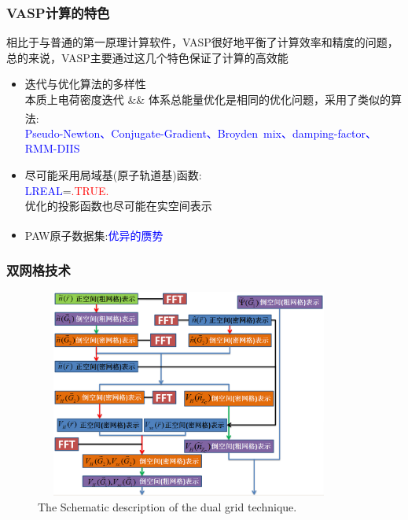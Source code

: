 \documentclass[cjk,slidestop,compress,mathserif,blue]{beamer}
\newcommand{\upcite}[1]{\hspace{0ex}\textsuperscript{\cite{#1}}} %
\begin{document}
\frame
{
	\frametitle{\textrm{VASP}计算的特色}
	相比于与普通的第一原理计算软件，\textrm{VASP}很好地平衡了计算效率和精度的问题，总的来说，\textrm{VASP}主要通过这几个特色保证了计算的高效能
	\begin{itemize}
	     \item 迭代与优化算法的多样性\\
		     本质上电荷密度迭代 \textrm{\&\&} 体系总能量优化是相同的优化问题，采用了类似的算法\upcite{CMS6-15_1996,PRB54-11169_1996}:\\
			\textcolor{blue}{\textrm{Pseudo-Newton、Conjugate-Gradient、Broyden~mix、damping-factor、RMM-DIIS}}
	     \item 尽可能采用局域基(原子轨道基)函数:~\\
		     \textcolor{blue}{\textrm{LREAL}}=\textcolor{red}{\textrm{.TRUE.}}\\
			优化的投影函数也尽可能在实空间表示
	     \item \textrm{PAW}原子数据集:\textcolor{blue}{优异的赝势}\upcite{PRB59-1758_1999}
	\end{itemize}
}

\frame
{
	\frametitle{双网格技术}
\begin{figure}[h!]
	\vspace{-0.2in}
\centering
\includegraphics[height=2.7in,width=4.0in,viewport=0 0 800 600,clip]{Figures/dual_grid-2.png}
\caption{\tiny \textrm{The Schematic description of the dual grid technique.}}%
\label{PAW_dualgrid}
\end{figure} 
}
\end{document}
